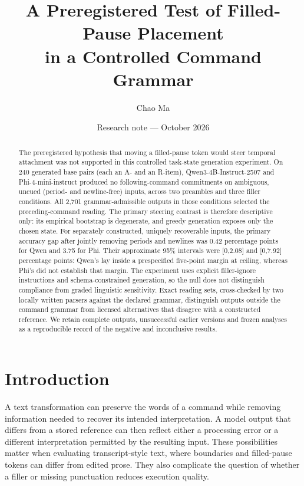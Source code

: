 \documentclass[11pt]{article}
\title{A Preregistered Test of Filled-Pause Placement\\in a Controlled Command Grammar}
\author{Chao Ma}
\date{Research note --- October 2026}
\begin{document}
\maketitle
\begin{abstract}
The preregistered hypothesis that moving a filled-pause token would steer temporal attachment was not supported in this controlled task-state generation experiment. On 240 generated base pairs (each an A- and an R-item), Qwen3-4B-Instruct-2507 and Phi-4-mini-instruct produced no following-command commitments on ambiguous, uncued (period- and newline-free) inputs, across two preambles and three filler conditions. All 2,701 grammar-admissible outputs in those conditions selected the preceding-command reading. The primary steering contrast is therefore descriptive only: its empirical bootstrap is degenerate, and greedy generation exposes only the chosen state. For separately constructed, uniquely recoverable inputs, the primary accuracy gap after jointly removing periods and newlines was 0.42 percentage points for Qwen and 3.75 for Phi. Their approximate 95\% intervals were [0,2.08] and [0,7.92] percentage points: Qwen's lay inside a prespecified five-point margin at ceiling, whereas Phi's did not establish that margin. The experiment uses explicit filler-ignore instructions and schema-constrained generation, so the null does not distinguish compliance from graded linguistic sensitivity. Exact reading sets, cross-checked by two locally written parsers against the declared grammar, distinguish outputs outside the command grammar from licensed alternatives that disagree with a constructed reference. We retain complete outputs, unsuccessful earlier versions and frozen analyses as a reproducible record of the negative and inconclusive results.
\end{abstract}

\section{Introduction}
A text transformation can preserve the words of a command while removing information needed to recover its intended interpretation. A model output that differs from a stored reference can then reflect either a processing error or a different interpretation permitted by the resulting input. These possibilities matter when evaluating transcript-style text, where boundaries and filled-pause tokens can differ from edited prose. They also complicate the question of whether a filler or missing punctuation reduces execution quality.
\end{document}
